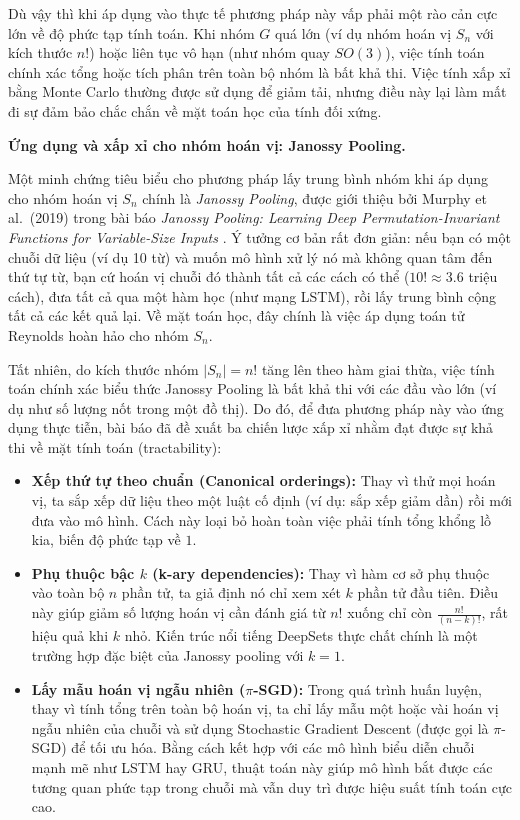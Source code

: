 Dù vậy thì khi áp dụng vào thực tế phương pháp này vấp phải một rào cản cực lớn về độ phức tạp tính toán. Khi nhóm $G$ quá lớn (ví dụ nhóm hoán vị $S_n$ với kích thước $n!$) hoặc liên tục vô hạn (như nhóm quay $SO(3)$), việc tính toán chính xác tổng hoặc tích phân trên toàn bộ nhóm là bất khả thi. Việc tính xấp xỉ bằng Monte Carlo thường được sử dụng để giảm tải, nhưng điều này lại làm mất đi sự đảm bảo chắc chắn về mặt toán học của tính đối xứng.

\vspace{0.5em}
\textbf{Ứng dụng và xấp xỉ cho nhóm hoán vị: Janossy Pooling.}

Một minh chứng tiêu biểu cho phương pháp lấy trung bình nhóm khi áp dụng cho nhóm hoán vị $S_n$ chính là \textit{Janossy Pooling}, được giới thiệu bởi Murphy et al.\ (2019) trong bài báo \textit{Janossy Pooling: Learning Deep Permutation-Invariant Functions for Variable-Size Inputs} \cite{murphy2019janossy}. Ý tưởng cơ bản rất đơn giản: nếu bạn có một chuỗi dữ liệu (ví dụ 10 từ) và muốn mô hình xử lý nó mà không quan tâm đến thứ tự từ, bạn cứ hoán vị chuỗi đó thành tất cả các cách có thể ($10! \approx 3.6$ triệu cách), đưa tất cả qua một hàm học (như mạng LSTM), rồi lấy trung bình cộng tất cả các kết quả lại. Về mặt toán học, đây chính là việc áp dụng toán tử Reynolds hoàn hảo cho nhóm $S_n$.

Tất nhiên, do kích thước nhóm $|S_n| = n!$ tăng lên theo hàm giai thừa, việc tính toán chính xác biểu thức Janossy Pooling là bất khả thi với các đầu vào lớn (ví dụ như số lượng nốt trong một đồ thị). Do đó, để đưa phương pháp này vào ứng dụng thực tiễn, bài báo đã đề xuất ba chiến lược xấp xỉ nhằm đạt được sự khả thi về mặt tính toán (tractability):
\begin{itemize}
    \item \textbf{Xếp thứ tự theo chuẩn (Canonical orderings):} Thay vì thử mọi hoán vị, ta sắp xếp dữ liệu theo một luật cố định (ví dụ: sắp xếp giảm dần) rồi mới đưa vào mô hình. Cách này loại bỏ hoàn toàn việc phải tính tổng khổng lồ kia, biến độ phức tạp về $1$.
    \item \textbf{Phụ thuộc bậc $k$ (k-ary dependencies):} Thay vì hàm cơ sở phụ thuộc vào toàn bộ $n$ phần tử, ta giả định nó chỉ xem xét $k$ phần tử đầu tiên. Điều này giúp giảm số lượng hoán vị cần đánh giá từ $n!$ xuống chỉ còn $\frac{n!}{(n-k)!}$, rất hiệu quả khi $k$ nhỏ. Kiến trúc nổi tiếng DeepSets \cite{zaheer2017deep} thực chất chính là một trường hợp đặc biệt của Janossy pooling với $k=1$.
    \item \textbf{Lấy mẫu hoán vị ngẫu nhiên ($\pi$-SGD):} Trong quá trình huấn luyện, thay vì tính tổng trên toàn bộ hoán vị, ta chỉ lấy mẫu một hoặc vài hoán vị ngẫu nhiên của chuỗi và sử dụng Stochastic Gradient Descent (được gọi là $\pi$-SGD) để tối ưu hóa. Bằng cách kết hợp với các mô hình biểu diễn chuỗi mạnh mẽ như LSTM hay GRU, thuật toán này giúp mô hình bắt được các tương quan phức tạp trong chuỗi mà vẫn duy trì được hiệu suất tính toán cực cao.
\end{itemize}


